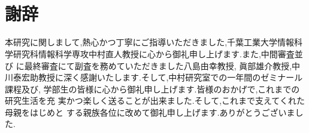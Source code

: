 \documentclass[12pt]{ltjsreport}%
\begin{document}

\chapter*{　\\謝辞}
本研究に関しまして,熱心かつ丁寧にご指導いただきました,千葉工業大学情報科
学研究科情報科学専攻中村直人教授に心から御礼申し上げます.また,中間審査並び
に最終審査にて副査を務めていただきました八島由幸教授, 眞部雄介教授,中川泰宏助教授に深く感謝いたします.そして,中村研究室での一年間のゼミナール課程及び,
学部生の皆様に心から御礼申し上げます.皆様のおかげで,これまでの研究生活を充
実かつ楽しく送ることが出来ました.そして,これまで支えてくれた母親をはじめと
する親族各位に改めて御礼申し上げます.ありがとうございました.

\end{document}
